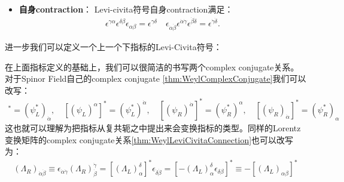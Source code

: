 \begin{itemize}
  \item \textbf{自身contraction}： Levi-civita符号自身contraction满足：
    \begin{align}
      \epsilon^{\gamma\alpha}\epsilon^{\delta\beta}\epsilon_{\alpha\beta}=\epsilon^{\gamma\delta}\quad\epsilon_{\dot{\alpha}\dot{\beta}}\epsilon^{\dot{\alpha}\dot{\gamma}}\epsilon^{\dot{\beta}\dot{\delta}}=\epsilon^{\dot{\gamma}\dot{\delta}}.
    \end{align}
\end{itemize}
进一步我们可以定义一个上一个下指标的Levi-Civita符号：

\bigskip
{}

在上面指标定义的基础上，我们可以很简洁的书写两个complex conjugate关系。对于Spinor Field自己的complex
conjugate \cref{thm:WeylComplexConjugate}我们可以改写：
\begin{align}
  [(\psi_L)_\alpha]^*=(\psi_L^*)_{\dot{\alpha}},\quad[(\psi_L)^\alpha]^*=(\psi_L^*)^{\dot{\alpha}},\quad[(\psi_R)^{\dot{\alpha}}]^*=(\psi_R^*)^\alpha,\quad[(\psi_R)_{\dot{\alpha}}]^*=(\psi_R^*)_\alpha
\end{align}
这也就可以理解为把指标从复共轭之中提出来会变换指标的类型。同样的Lorentz变换矩阵的complex
conjugate关系\cref{thm:WeylLeviCivitaConnection}也可以改写为：
\begin{align}
  (\Lambda_R)_{\dot{\alpha}\dot{\beta}}\equiv\epsilon_{\dot{\alpha}\dot{\gamma}}\left(\Lambda_R\right)_{\dot{\beta}}^{\dot{\gamma}}=\left[\left(\Lambda_L\right)_\alpha^\delta\right]^*\epsilon_{\dot{\delta}\dot{\beta}}=\left[-\left(\Lambda_L\right)_\alpha^\delta\epsilon_{\delta\beta}\right]^*\equiv-\left[\left(\Lambda_L\right)_{\alpha\beta}\right]^*
\end{align}

